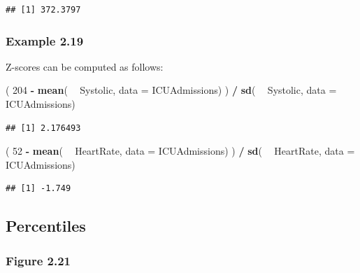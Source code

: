 \documentclass[]{book}
\newenvironment{Shaded}{\begin{snugshade}}{\end{snugshade}}
\newcommand{\DataTypeTok}[1]{\textcolor[rgb]{0.13,0.29,0.53}{#1}}
\newcommand{\DecValTok}[1]{\textcolor[rgb]{0.00,0.00,0.81}{#1}}
\newcommand{\KeywordTok}[1]{\textcolor[rgb]{0.13,0.29,0.53}{\textbf{#1}}}
\newcommand{\NormalTok}[1]{#1}
\newcommand{\OperatorTok}[1]{\textcolor[rgb]{0.81,0.36,0.00}{\textbf{#1}}}
\newcommand{\StringTok}[1]{\textcolor[rgb]{0.31,0.60,0.02}{#1}}
\begin{document}
\begin{verbatim}
## [1] 372.3797
\end{verbatim}

\hypertarget{example-2.19}{%
\subsubsection{Example 2.19}\label{example-2.19}}

Z-scores can be computed as follows:

\begin{Shaded}
\begin{Highlighting}[]
\NormalTok{( }\DecValTok{204} \OperatorTok{-}\StringTok{ }\KeywordTok{mean}\NormalTok{( }\OperatorTok{~}\StringTok{ }\NormalTok{Systolic, }\DataTypeTok{data =}\NormalTok{ ICUAdmissions) ) }\OperatorTok{/}\StringTok{ }\KeywordTok{sd}\NormalTok{( }\OperatorTok{~}\StringTok{ }\NormalTok{Systolic, }\DataTypeTok{data =}\NormalTok{ ICUAdmissions)}
\end{Highlighting}
\end{Shaded}

\begin{verbatim}
## [1] 2.176493
\end{verbatim}

\begin{Shaded}
\begin{Highlighting}[]
\NormalTok{( }\DecValTok{52} \OperatorTok{-}\StringTok{ }\KeywordTok{mean}\NormalTok{( }\OperatorTok{~}\StringTok{ }\NormalTok{HeartRate, }\DataTypeTok{data =}\NormalTok{ ICUAdmissions) ) }\OperatorTok{/}\StringTok{ }\KeywordTok{sd}\NormalTok{( }\OperatorTok{~}\StringTok{ }\NormalTok{HeartRate, }\DataTypeTok{data =}\NormalTok{ ICUAdmissions)}
\end{Highlighting}
\end{Shaded}

\begin{verbatim}
## [1] -1.749
\end{verbatim}

\hypertarget{percentiles}{%
\subsection{Percentiles}\label{percentiles}}

\hypertarget{figure-2.21}{%
\subsubsection{Figure 2.21}\label{figure-2.21}}
\end{document}
